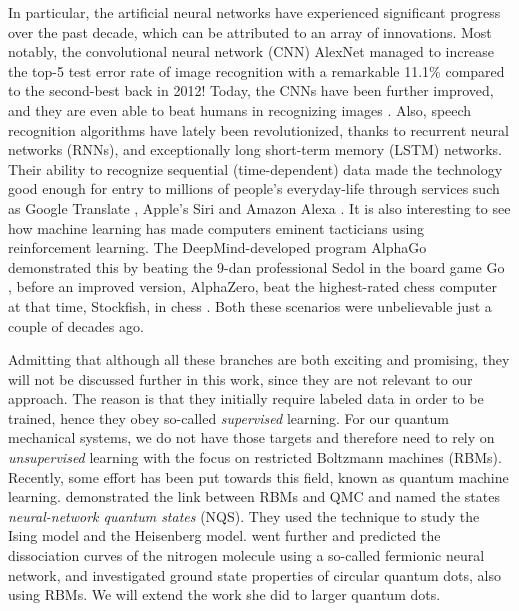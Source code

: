 In particular, the artificial neural networks have experienced significant progress over the past decade, which can be attributed to an array of innovations. Most notably, the convolutional neural network (CNN) AlexNet \cite{krizhevsky_imagenet_2012} managed to increase the top-5 test error rate of image recognition with a remarkable 11.1\% compared to the second-best back in 2012! Today, the CNNs have been further improved, and they are even able to beat humans in recognizing images \cite{alom_history_2018}. Also, speech recognition algorithms have lately been revolutionized, thanks to recurrent neural networks (RNNs), and exceptionally long short-term memory (LSTM) networks. Their ability to recognize sequential (time-dependent) data made the technology good enough for entry to millions of people's everyday-life through services such as Google Translate \cite{wu_googles_2016}, Apple's Siri \cite{smith_ios_2016} and Amazon Alexa \cite{noauthor_bringing_nodate}. It is also interesting to see how machine learning has made computers eminent tacticians using reinforcement learning. The DeepMind-developed program AlphaGo demonstrated this by beating the 9-dan professional Sedol in the board game Go \cite{silver2016mastering}, before an improved version, AlphaZero, beat the highest-rated chess computer at that time, Stockfish, in chess \cite{silver2017mastering}. Both these scenarios were unbelievable just a couple of decades ago.

Admitting that although all these branches are both exciting and promising, they will not be discussed further in this work, since they are not relevant to our approach. The reason is that they initially require labeled data in order to be trained, hence they obey so-called \textit{supervised} learning. For our quantum mechanical systems, we do not have those targets and therefore need to rely on \textit{unsupervised} learning with the focus on restricted Boltzmann machines (RBMs). Recently, some effort has been put towards this field, known as quantum machine learning. \citet{carleo_solving_2017} demonstrated the link between RBMs and QMC and named the states \textit{neural-network quantum states} (NQS). They used the technique to study the Ising model and the Heisenberg model. \citet{pfau2019abinitio} went further and predicted the dissociation curves of the nitrogen molecule using a so-called fermionic neural network, and \citet{flugsrud_vilde_moe_solving_nodate} investigated ground state properties of circular quantum dots, also using RBMs. We will extend the work she did to larger quantum dots.

